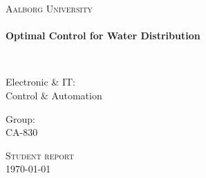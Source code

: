 \thispagestyle{empty}

\begin{center}

\vspace*{\fill}

\textsc{\LARGE Aalborg University}\\[1.0cm]

\HRule \\[0.4cm]
{ \HUGE \bfseries  Optimal Control for Water Distribution \\[0.5cm] }

\HRule \\[1.5cm]%

\begin{minipage}{0.4\textwidth}
\begin{flushleft} \large
Electronic \& IT:\\
Control \& Automation
\end{flushleft}
\end{minipage}
\begin{minipage}{0.4\textwidth}
\begin{flushright} \large
Group: \\
CA-830
\end{flushright}
\end{minipage}

\vspace*{\fill}

\textsc{\Large Student report}\\[1.0cm]

{\large \today}

\end{center}